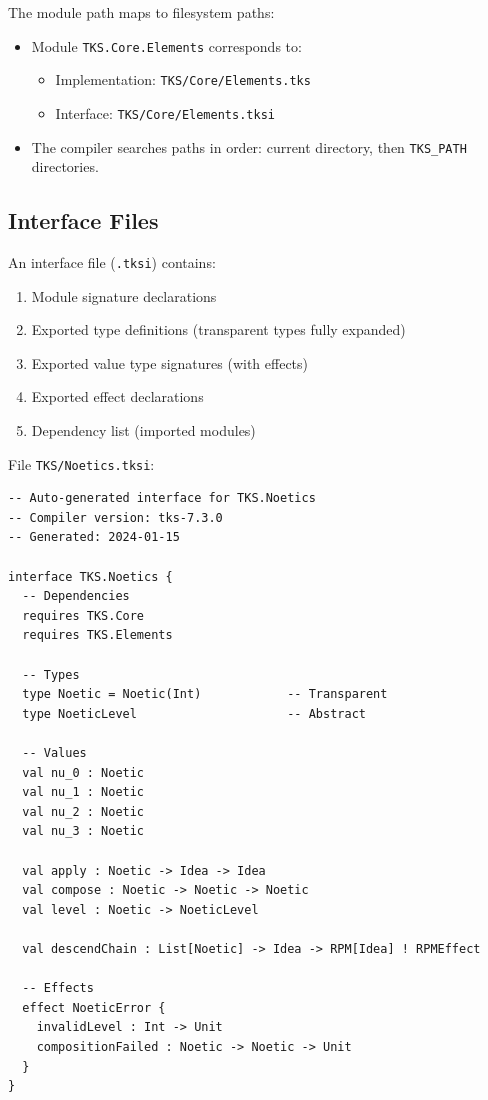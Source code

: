 \begin{definition}
\label{def:file-module-mapping}
The module path maps to filesystem paths:
\begin{itemize}
  \item Module \texttt{TKS.Core.Elements} corresponds to:
    \begin{itemize}
      \item Implementation: \texttt{TKS/Core/Elements.tks}
      \item Interface: \texttt{TKS/Core/Elements.tksi}
    \end{itemize}
  \item The compiler searches paths in order: current directory, then \texttt{TKS\_PATH} directories.
\end{itemize}
\end{definition}

\subsection{Interface Files}
\label{subsec:interface-files}

\begin{definition}
\label{def:interface-content}
An interface file (\texttt{.tksi}) contains:
\begin{enumerate}
  \item Module signature declarations
  \item Exported type definitions (transparent types fully expanded)
  \item Exported value type signatures (with effects)
  \item Exported effect declarations
  \item Dependency list (imported modules)
\end{enumerate}
\end{definition}

\begin{example}
\label{ex:interface-file}
File \texttt{TKS/Noetics.tksi}:
\begin{verbatim}
-- Auto-generated interface for TKS.Noetics
-- Compiler version: tks-7.3.0
-- Generated: 2024-01-15

interface TKS.Noetics {
  -- Dependencies
  requires TKS.Core
  requires TKS.Elements

  -- Types
  type Noetic = Noetic(Int)            -- Transparent
  type NoeticLevel                     -- Abstract

  -- Values
  val nu_0 : Noetic
  val nu_1 : Noetic
  val nu_2 : Noetic
  val nu_3 : Noetic

  val apply : Noetic -> Idea -> Idea
  val compose : Noetic -> Noetic -> Noetic
  val level : Noetic -> NoeticLevel

  val descendChain : List[Noetic] -> Idea -> RPM[Idea] ! RPMEffect

  -- Effects
  effect NoeticError {
    invalidLevel : Int -> Unit
    compositionFailed : Noetic -> Noetic -> Unit
  }
}
\end{verbatim}
\end{example}

